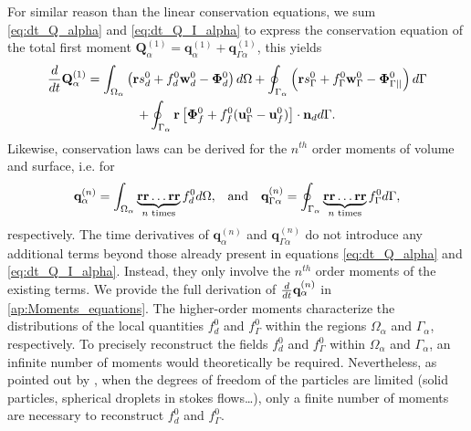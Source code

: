 For similar reason than the linear conservation equations, we sum \ref{eq:dt_Q_alpha} and \ref{eq:dt_Q_I_alpha} to express the conservation equation of the total first moment $\textbf{Q}^{(1)}_\alpha = \textbf{q}^{(1)}_\alpha + \textbf{q}^{(1)}_{\Gamma\alpha}$, this yields 
\begin{multline}
    \ddt {\textbf{Q}^{(1)}_\alpha}
    = \intO{ \left(
        \textbf{r} s_d^0         
        + f_d^0  \textbf{w}_d^0 
        - \mathbf{\Phi}_d^0
    \right) }
    + \intS{ \left(
        \textbf{r}s_\Gamma^0
        + f_\Gamma^0 \textbf{w}_\Gamma^0
        - \mathbf{\Phi}_{\Gamma||}^0
    \right) } \\
    + \intS{ \textbf{r} \left[
        \mathbf{\Phi}_f^0
        + f_f^0 (\textbf{u}_\Gamma^0-\textbf{u}_f^0)
    \right]\cdot \textbf{n}_d  }. 
    \label{eq:dt_Q_alpha_tot}
\end{multline}
Likewise, conservation laws can be derived for the $n^{th}$ order moments of volume and surface, i.e. for
\begin{align}
    \textbf{q}^{(n)}_{\alpha}
    = \intO{
         \underbrace{\textbf{rr}\ldots \textbf{rr}}_{n\text{ times}}
        f_d^0 },
        && \text{and} &&
    \textbf{q}^{(n)}_{\Gamma\alpha}
    = \intS{
         \underbrace{\textbf{rr}\ldots \textbf{rr}}_{n\text{ times}}
    f_\Gamma^0 },
    \label{eq:Q_n_definition}
\end{align} 
respectively. The time derivatives of $\textbf{q}^{(n)}_{\alpha}$ and $\textbf{q}^{(n)}_{\Gamma\alpha}$ do not introduce any additional terms beyond those already present in equations \ref{eq:dt_Q_alpha} and \ref{eq:dt_Q_I_alpha}.
Instead, they only involve the $n^{th}$ order moments of the existing terms.
We provide the full derivation of $\frac{d}{dt}{ \textbf{q}^{(n)}_{\alpha}}$ in \ref{ap:Moments_equations}.
The higher-order moments characterize the distributions of the local quantities $f_d^0$ and $f_\Gamma^0$ within the regions $\Omega_\alpha$ and $\Gamma_\alpha$, respectively. 
To precisely reconstruct the fields $f_d^0$ and $f_\Gamma^0$ within $\Omega_\alpha$ and $\Gamma_\alpha$, an infinite number of moments would theoretically be required. 
Nevertheless, as pointed out by \citet[Appendix A]{zhang1997momentum}, when the degrees of freedom of the particles are limited (solid particles, spherical droplets in stokes flows\ldots), only a finite number of moments are necessary to reconstruct $f_d^0$ and $f_\Gamma^0$. 
